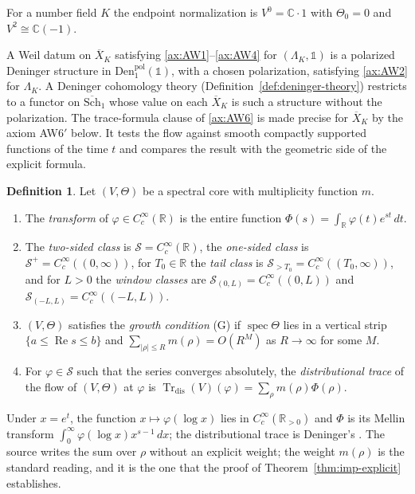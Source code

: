 \documentclass[11pt]{amsart}
\theoremstyle{plain}
\theoremstyle{definition}
\newtheorem{definition}[theorem]{Definition}
\theoremstyle{remark}
\numberwithin{equation}{section}
\newcommand{\C}{\mathbb{C}}
\newcommand{\R}{\mathbb{R}}
\newcommand{\Xbar}{\overline{X}}
\newcommand{\Schbar}{\overline{\mathrm{Sch}}}
\newcommand{\Den}{\mathrm{Den}}
\DeclareMathOperator{\Tr}{Tr}
\DeclareMathOperator{\spec}{spec}
\DeclareMathOperator{\Rea}{Re}
\renewcommand{\Re}{\Rea}
\begin{document}
For a number field $K$ the endpoint normalization is
$V^0=\C\cdot1$ with $\Theta_0=0$ and $V^2\cong\C(-1)$.

A Weil datum on $\Xbar_K$ satisfying \ref{ax:AW1}--\ref{ax:AW4} for
$(\Lambda_K,\mathbb 1)$ is a polarized Deninger structure in
$\Den^{\mathrm{pol}}_1(\mathbb 1)$, with a chosen polarization,
satisfying \ref{ax:AW2} for $\Lambda_K$. A Deninger cohomology theory
(Definition~\ref{def:deninger-theory}) restricts to a functor on
$\Schbar_1$ whose value on each $\Xbar_K$ is such a structure
without the polarization.
The trace-formula clause of \ref{ax:AW6} is made precise for $\Xbar_K$
by the axiom AW6$'$ below. It tests the flow against smooth compactly
supported functions of the time $t$ and compares the result with the
geometric side of the explicit formula.

\begin{definition}\label{def:test-classes}
Let $(V,\Theta)$ be a spectral core with multiplicity function $m$.
\begin{enumerate}[label=(\alph*)]
\item The \emph{transform} of $\varphi\in C_c^\infty(\R)$ is the entire
  function $\Phi(s)=\int_\R\varphi(t)e^{st}\,dt$.
\item The \emph{two-sided class} is $\mathcal S=C_c^\infty(\R)$, the
  \emph{one-sided class} is $\mathcal S^+=C_c^\infty((0,\infty))$, for
  $T_0\in\R$ the \emph{tail class} is
  $\mathcal S_{>T_0}=C_c^\infty((T_0,\infty))$, and for $L>0$ the
  \emph{window classes} are $\mathcal S_{(0,L)}=C_c^\infty((0,L))$ and
  $\mathcal S_{(-L,L)}=C_c^\infty((-L,L))$.
\item $(V,\Theta)$ satisfies the \emph{growth condition} (G) if
  $\spec\Theta$ lies in a vertical strip $\{a\le\Re s\le b\}$ and
  $\sum_{|\rho|\le R}m(\rho)=O(R^M)$ as $R\to\infty$ for some $M$.
\item For $\varphi\in\mathcal S$ such that the series converges
  absolutely, the \emph{distributional trace} of the flow of
  $(V,\Theta)$ at $\varphi$ is
  $\Tr_{\mathrm{dis}}(V)(\varphi)=\sum_\rho m(\rho)\Phi(\rho)$.
\end{enumerate}
\end{definition}

Under $x=e^t$, the function $x\mapsto\varphi(\log x)$ lies in
$C_c^\infty(\R_{>0})$ and $\Phi$ is its Mellin transform
$\int_0^\infty\varphi(\log x)x^{s-1}\,dx$; the distributional trace is
Deninger's \cite[(4) and the display after it, p.~170]
{Deninger1998Analogies}.
The source writes the sum over $\rho$ without an explicit weight; the
weight $m(\rho)$ is the standard reading, and it is the one that the
proof of Theorem~\ref{thm:imp-explicit} establishes.
\end{document}
